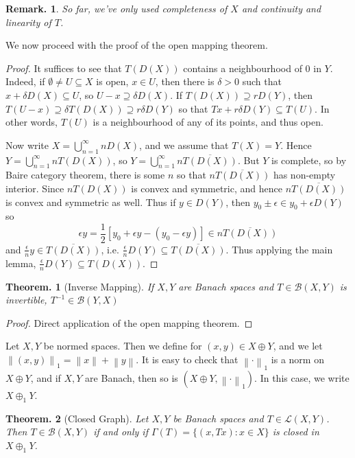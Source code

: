 \documentclass[11pt, a4paper]{memoir}
\newcommand{\norm}[1]{\ensuremath{\left\lVert#1\right\rVert}}
\theoremstyle{change}
\newtheorem{theorem}{Theorem.}[section]
\theoremstyle{plain}
\theoremstyle{nonumberplain}
\newtheorem{remark}{Remark.}
\newtheorem{proof}{Proof}
\numberwithin{equation}{section}
\begin{document}
\begin{remark}
    So far, we've only used completeness of $X$ and continuity and linearity of $T$.
\end{remark}
We now proceed with the proof of the open mapping theorem.
\begin{proof}
    It suffices to see that $T(D(X))$ contains a neighbourhood of $0$ in $Y$.
    Indeed, if $\emptyset\neq U\subseteq X$ is open, $x\in U$, then there is $\delta>0$ such that $x+\delta D(X)\subseteq U$, so $U-x\supseteq\delta D(X)$.
    If $T(D(X))\supseteq rD(Y)$, then $T(U-x)\supseteq\delta T(D(X))\supseteq r\delta D(Y)$ so that $Tx+r\delta D(Y)\subseteq T(U)$.
    In other words, $T(U)$ is a neighbourhood of any of its points, and thus open.

    Now write $X=\bigcup_{n=1}^\infty nD(X)$, and we assume that $T(X)=Y$.
    Hence $Y=\bigcup_{n=1}^\infty nT(D(X))$, so $Y=\bigcup_{n=1}^\infty n\overline{T(D(X))}$.
    But $Y$ is complete, so by Baire category theorem, there is some $n$ so that $n\overline{T(D(X))}$ has non-empty interior.
    Since $nT(D(X))$ is convex and symmetric, and hence $n\overline{T(D(X))}$ is convex and symmetric as well.
    Thus if $y\in D(Y)$, then $y_0\pm\epsilon\in y_0+\epsilon D(Y)$ so
    \begin{equation*}
        \epsilon y=\frac{1}{2}\left[y_0+\epsilon y-(y_0-\epsilon y)\right]\in n\overline{T(D(X))}
    \end{equation*}
    and $\frac{\epsilon}{n}y\in\overline{T(D(X))}$, i.e. $\frac{\epsilon}{n} D(Y)\subseteq\overline{T(D(X))}$.
    Thus applying the main lemma, $\frac{\epsilon}{n}D(Y)\subseteq T(D(X))$.
\end{proof}
\begin{theorem}[Inverse Mapping]
    If $X,Y$ are Banach spaces and $T\in \mathcal{B}(X,Y)$ is invertible, $T^{-1}\in\mathcal{B}(Y,X)$
\end{theorem}
\begin{proof}
    Direct application of the open mapping theorem.
\end{proof}
Let $X,Y$ be normed spaces.
Then we define for $(x,y)\in X\oplus Y$, and we let $\norm{(x,y)}_1=\norm{x}+\norm{y}$.
It is easy to check that $\norm{\cdot}_1$ is a norm on $X\oplus Y$, and if $X,Y$ are Banach, then so is $(X\oplus Y,\norm{\cdot}_1)$.
In this case, we write $X\oplus_1 Y$.
\begin{theorem}[Closed Graph]
    Let $X,Y$ be Banach spaces and $T\in\mathcal{L}(X,Y)$.
    Then $T\in\mathcal{B}(X,Y)$ if and only if $\Gamma(T)=\{(x,Tx):x\in X\}$ is closed in $X\oplus_1Y$.
\end{theorem}
\end{document}
